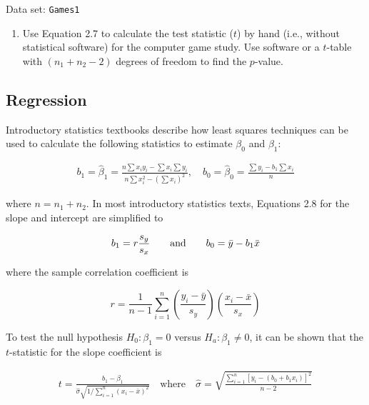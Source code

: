 \documentclass[
]{book}
\providecommand{\tightlist}{%
  \setlength{\itemsep}{0pt}\setlength{\parskip}{0pt}}
\begin{document}
Data set: \texttt{Games1}

\begin{enumerate}
\def\labelenumi{\arabic{enumi}.}
\setcounter{enumi}{33}
\tightlist
\item
  Use Equation 2.7 to calculate the test statistic (\(t\)) by hand (i.e., without statistical software) for the computer game study. Use software or a \(t\)-table with \((n_1 + n_2 - 2)\) degrees of freedom to find the \(p\)-value.
\end{enumerate}

\hypertarget{regression}{%
\subsection*{Regression}\label{regression}}

Introductory statistics textbooks describe how least squares techniques can be used to calculate the following statistics to estimate \(\beta_0\) and \(\beta_1\):

\begin{align} 
\label{2.8}
b_1 = \hat{\beta}_1 = \frac{n\sum x_i y_i - \sum x_i \sum y_i}{n\sum x_i^2 - (\sum x_i)^2}, \quad
b_0 = \hat{\beta}_0 = \frac{\sum y_i - b_1 \sum x_i}{n}
\tag{2.8}
\end{align}

where \(n = n_1 + n_2\). In most introductory statistics texts, Equations 2.8 for the slope and intercept are simplified to

\begin{align}
b_1 = r \frac{s_y}{s_x}
\qquad \text{and} \qquad
b_0 = \bar{y} - b_1 \bar{x} 
\notag
\end{align}

where the sample correlation coefficient is

\[
r = \frac{1}{n - 1} \sum_{i=1}^{n} \left(\frac{y_i - \bar{y}}{s_y}\right) \left(\frac{x_i - \bar{x}}{s_x}\right)
\]

To test the null hypothesis \(H_0\!:\! \beta_1 = 0\) versus \(H_a\!:\! \beta_1 \ne 0\), it can be shown that the \(t\)-statistic for the slope coefficient is

\begin{align} 
\label{2.9}
t = \frac{b_1 - \beta_1}{\hat{\sigma} \sqrt{1 / \sum_{i=1}^{n}(x_i - \bar{x})^2}} \quad \text{where} \quad \hat{\sigma} = \sqrt{\frac{\sum_{i=1}^{n}[y_i - (b_0 + b_1 x_i)]^2}{n-2}}
\tag{2.9}
\end{align}
\end{document}
